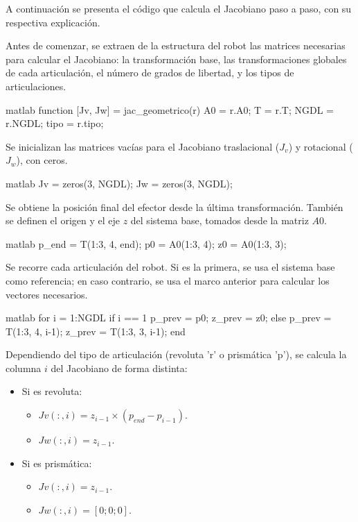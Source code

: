 A continuación se presenta el código que calcula el Jacobiano paso a paso, con su respectiva explicación.

Antes de comenzar, se extraen de la estructura del robot las matrices necesarias para calcular el Jacobiano: la transformación base, las transformaciones globales de cada articulación, el número de grados de libertad, y los tipos de articulaciones.

\begin{matlabcode}{matlab}
	function [Jv, Jw] = jac_geometrico(r)
	A0 = r.A0;
	T = r.T;
	NGDL = r.NGDL;
	tipo = r.tipo;
\end{matlabcode}

Se inicializan las matrices vacías para el Jacobiano traslacional ($J_v$) y rotacional ($J_w$), con ceros.

\begin{matlabcode}{matlab}
	Jv = zeros(3, NGDL);
	Jw = zeros(3, NGDL);
\end{matlabcode}

Se obtiene la posición final del efector desde la última transformación. También se definen el origen y el eje $z$ del sistema base, tomados desde la matriz $A0$.

\begin{matlabcode}{matlab}
	p_end = T(1:3, 4, end);
	p0 = A0(1:3, 4);
	z0 = A0(1:3, 3);
\end{matlabcode}

Se recorre cada articulación del robot. Si es la primera, se usa el sistema base como referencia; en caso contrario, se usa el marco anterior para calcular los vectores necesarios.

\begin{matlabcode}{matlab}
	for i = 1:NGDL
	if i == 1
	p_prev = p0;
	z_prev = z0;
	else
	p_prev = T(1:3, 4, i-1);
	z_prev = T(1:3, 3, i-1);
	end
\end{matlabcode}

Dependiendo del tipo de articulación (revoluta 'r' o prismática 'p'), se calcula la columna $i$ del Jacobiano de forma distinta:
\begin{itemize}
	\item Si es revoluta:
	\begin{itemize}
		\item $Jv(:,i) = z_{i-1} \times (p_{end} - p_{i-1})$.
		\item $Jw(:,i) = z_{i-1}$.
	\end{itemize}
	\item Si es prismática:
	\begin{itemize}
		\item $Jv(:,i) = z_{i-1}$.
		\item $Jw(:,i) = [0; 0; 0]$.
	\end{itemize}
\end{itemize}

